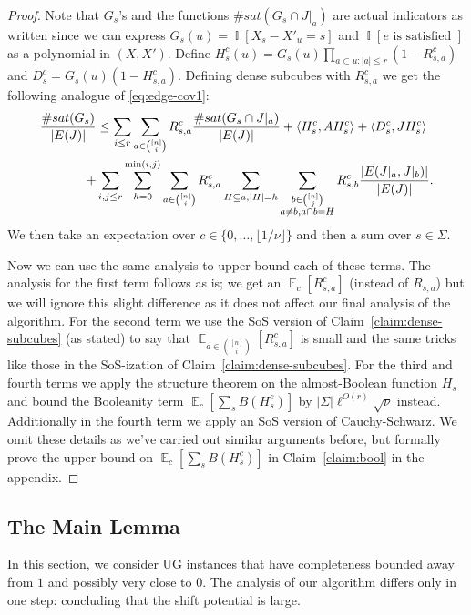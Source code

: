 \documentclass[11pt]{article}
\DeclareMathOperator*{\E}{\mathbb{E}}
\DeclareMathOperator*{\Ind}{\mathbb{I}}
\DeclarePairedDelimiter\ip{\langle}{\rangle}
\def \sos {SoS\xspace}
\theoremstyle{definition}
\begin{document}
\begin{proof}
Note that $G_s$'s and the functions $\#sat(G_s \cap J|_a)$ are actual indicators as written since we can express $G_s(u) = \Ind[X_s - X'_u = s]$ and $\Ind[e \text{ is satisfied }]$ as a polynomial in $(X,X')$. Define $H^c_s(u) = G_s(u)\prod_{a \subset u: |a| \leq r}(1-R^c_{s,a})$ and $D^c_{s} = G_s(u)(1 - H^c_{s,a})$. Defining dense subcubes with $R^c_{s,a}$ we get the following analogue of \eqref{eq:edge-cov1}:
\begin{align}\label{eq:edge-cov1-sos}
\frac{\#sat(G_s)}{|E(J)|} &\leq \sum_{i \leq r} \sum_{a \in {[n] \choose i}}R^c_{s,a} \frac{\# sat(G_s \cap J|_a)}{|E(J)|} +
\ip{H^c_s, AH^c_s} + \ip{D^c_s, JH^c_s} \notag\\+&\sum_{i, j \leq r} 
\sum\limits_{h=0}^{\min(i,j)}
\sum_{a \in {[n] \choose i}} R^c_{s,a}
\sum_{H\subseteq a, |H| = h}
\sum_{\substack{b \in {[n] \choose j} \\ a \neq b, a\cap b = H}} R^c_{s,b} \frac{|E(J|_a, J|_b)|}{|E(J)|}.
\end{align}
We then take an expectation over $c \in \{0,\ldots,\lfloor 1/\nu \rfloor\}$ and then a sum over $s \in \Sigma$.

Now we can use the same analysis to upper bound each of these terms. The analysis for the first term follows as is; we get an $\E_c[R^c_{s,a}]$ (instead of $R_{s,a}$) but we will ignore this slight difference as it does not affect our final analysis of the algorithm.
For the second term we use the \sos version of Claim~\ref{claim:dense-subcubes} (as stated) to say that $\E_{a \in {[n] \choose i}}[R^c_{s,a}]$ is small and the same tricks like those in the SoS-ization of Claim~\ref{claim:dense-subcubes}. For the third and fourth terms we apply the structure theorem on the almost-Boolean function $H_s$ and bound the Booleanity term $\E_c[\sum_s B(H^c_s)]$ by $|\Sigma|\ell^{O(r)}\sqrt{\nu}$ instead. Additionally in the fourth term we apply an \sos version of Cauchy-Schwarz. We omit these details as we've carried out similar arguments before, but formally prove the upper bound on $\E_c[\sum_s B(H^c_s)]$ in Claim~\ref{claim:bool} in the appendix.
\end{proof}


\subsection{The Main Lemma}
In this section, we consider UG instances that have completeness bounded away from $1$ and possibly very close to $0$. The analysis of our algorithm differs only in one step: concluding that the shift potential is large. 
\end{document}
